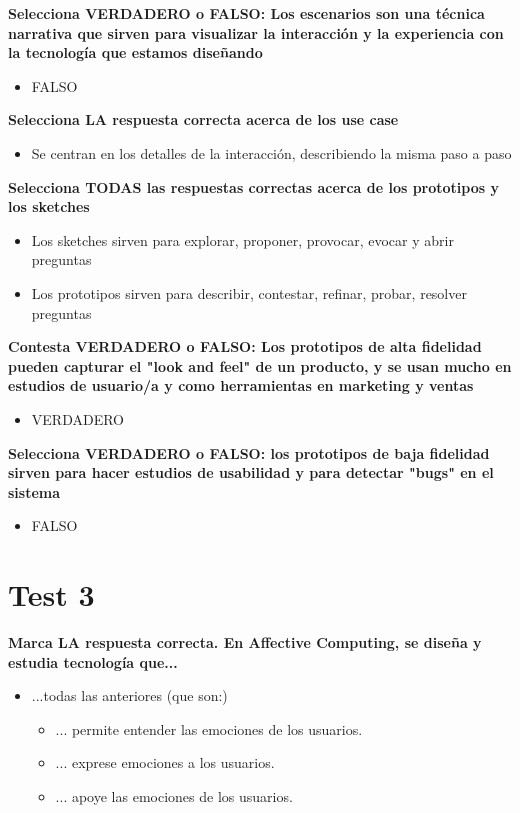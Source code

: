 \documentclass[12pt]{report} %
\begin{document}
\textbf{Selecciona VERDADERO o FALSO: Los escenarios son una técnica narrativa que sirven para visualizar la interacción y la experiencia con la tecnología que estamos diseñando}
\begin{itemize}
  \item FALSO
\end{itemize}

\textbf{Selecciona LA respuesta correcta acerca de los use case}
\begin{itemize}
  \item Se centran en los detalles de la interacción, describiendo la misma paso a paso
\end{itemize}

\textbf{Selecciona TODAS las respuestas correctas acerca de los prototipos y los sketches}
\begin{itemize}
  \item Los sketches sirven para explorar, proponer, provocar, evocar y abrir preguntas
  \item Los prototipos sirven para describir, contestar, refinar, probar, resolver preguntas
\end{itemize}

\textbf{Contesta VERDADERO o FALSO: Los prototipos de alta fidelidad pueden capturar el "look and feel" de un producto, y se usan mucho en estudios de usuario/a y como herramientas en marketing y ventas}
\begin{itemize}
  \item VERDADERO
\end{itemize}

\textbf{Selecciona VERDADERO o FALSO: los prototipos de baja fidelidad sirven para hacer estudios de usabilidad y para detectar "bugs"  en el sistema}
\begin{itemize}
  \item FALSO
\end{itemize}
\pagebreak
\section{Test 3}

\textbf{Marca LA respuesta correcta. En Affective Computing, se diseña y estudia tecnología que...}
\begin{itemize}
  \item ...todas las anteriores (que son:)
  \begin{itemize}
    \item ... permite entender las emociones de los usuarios.
    \item ... exprese emociones a los usuarios.
    \item ... apoye las emociones de los usuarios.
  \end{itemize}
\end{itemize}
\end{document}
